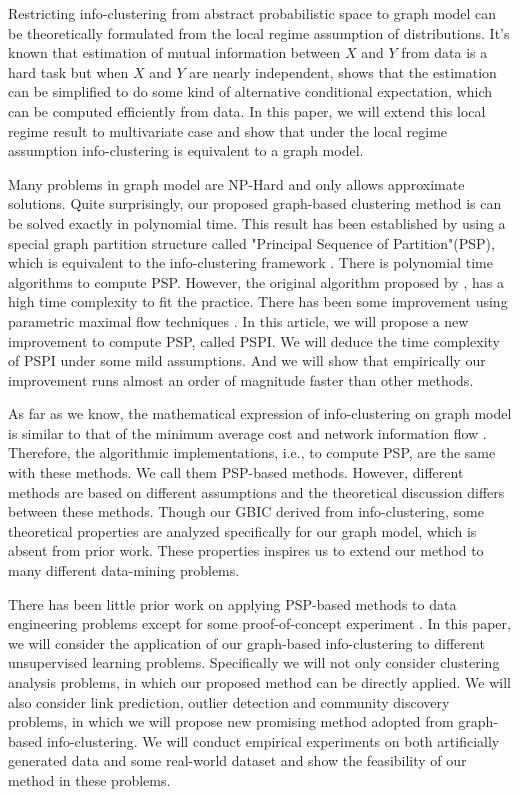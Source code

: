 Restricting info-clustering from abstract probabilistic space to graph model can be theoretically formulated from the local regime assumption of distributions. It's known that estimation of mutual information between $X$ and $Y$ from data is a hard task but when $X$ and $Y$ are nearly independent, \citet{huang2017information} shows that the estimation can be simplified to do some kind of alternative conditional expectation, which can be computed efficiently from data. In this paper, we will extend this local regime result to multivariate case and show that under the local regime assumption info-clustering is equivalent to a graph model.

Many problems in graph model are NP-Hard and only allows approximate solutions. Quite surprisingly, our proposed graph-based clustering method is can be solved exactly in polynomial time.
This result has been established by using a special graph partition structure called "Principal Sequence of Partition"(PSP), which is equivalent to the info-clustering framework \citep{ic2016}. There is polynomial time algorithms to compute PSP.
However, the original algorithm proposed by
\citet{narayanan}, has a high time complexity to fit the practice. There has been some improvement
using parametric maximal flow techniques \citep{kolmogorov}. In this article, we will propose a new improvement to compute PSP, called PSPI. We will deduce the time complexity of PSPI under some mild assumptions. And we will show that empirically our improvement runs almost an order of magnitude faster than other methods.

As far as we know, the mathematical expression of info-clustering on graph model is similar to that of the minimum average cost \citep{mac} and network information flow \citep{pin}. Therefore, the algorithmic implementations, i.e., to compute PSP, are the same with these methods. We call them PSP-based methods. However, different methods
are based on different assumptions and the theoretical discussion differs between these methods. Though our GBIC derived from info-clustering, some theoretical
properties are analyzed specifically for our graph model, which is absent from prior work. These properties inspires us to extend our method to many different data-mining problems.

There has been little prior work on applying PSP-based methods to data engineering problems except for some proof-of-concept experiment \citep{mac}. In this paper, we will consider the application
of our graph-based info-clustering to different unsupervised learning problems. Specifically
we will not only consider clustering analysis problems, in which our proposed method can be directly applied. We will also consider link prediction, outlier detection and community discovery problems, in which we will propose new promising
method adopted from graph-based info-clustering. We will conduct empirical experiments on both artificially generated data and some real-world dataset and show the feasibility of our method in
these problems.


